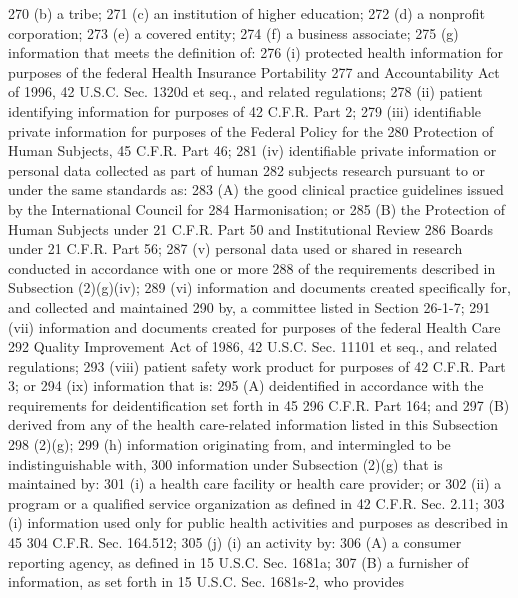 270          (b) a tribe;
271          (c) an institution of higher education;
272          (d) a nonprofit corporation;
273          (e) a covered entity;
274          (f) a business associate;
275          (g) information that meets the definition of:
276          (i) protected health information for purposes of the federal Health Insurance Portability
277     and Accountability Act of 1996, 42 U.S.C. Sec. 1320d et seq., and related regulations;
278          (ii) patient identifying information for purposes of 42 C.F.R. Part 2;
279          (iii) identifiable private information for purposes of the Federal Policy for the
280     Protection of Human Subjects, 45 C.F.R. Part 46;
281          (iv) identifiable private information or personal data collected as part of human
282     subjects research pursuant to or under the same standards as:
283          (A) the good clinical practice guidelines issued by the International Council for
284     Harmonisation; or
285          (B) the Protection of Human Subjects under 21 C.F.R. Part 50 and Institutional Review
286     Boards under 21 C.F.R. Part 56;
287          (v) personal data used or shared in research conducted in accordance with one or more
288     of the requirements described in Subsection (2)(g)(iv);
289          (vi) information and documents created specifically for, and collected and maintained
290     by, a committee listed in Section 26-1-7;
291          (vii) information and documents created for purposes of the federal Health Care
292     Quality Improvement Act of 1986, 42 U.S.C. Sec. 11101 et seq., and related regulations;
293          (viii) patient safety work product for purposes of 42 C.F.R. Part 3; or
294          (ix) information that is:
295          (A) deidentified in accordance with the requirements for deidentification set forth in 45
296     C.F.R. Part 164; and
297          (B) derived from any of the health care-related information listed in this Subsection
298     (2)(g);
299          (h) information originating from, and intermingled to be indistinguishable with,
300     information under Subsection (2)(g) that is maintained by:
301          (i) a health care facility or health care provider; or
302          (ii) a program or a qualified service organization as defined in 42 C.F.R. Sec. 2.11;
303          (i) information used only for public health activities and purposes as described in 45
304     C.F.R. Sec. 164.512;
305          (j) (i) an activity by:
306          (A) a consumer reporting agency, as defined in 15 U.S.C. Sec. 1681a;
307          (B) a furnisher of information, as set forth in 15 U.S.C. Sec. 1681s-2, who provides
